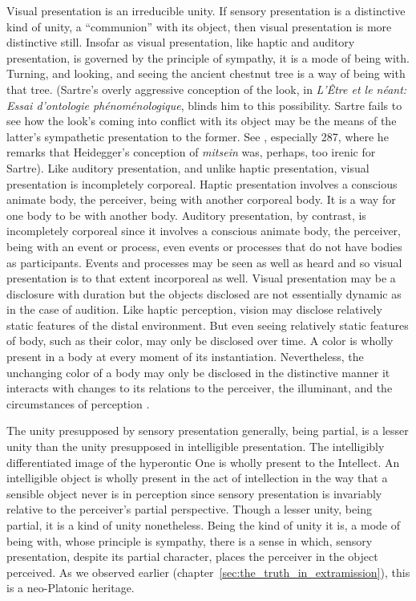 Visual presentation is an irreducible unity. If sensory presentation is a distinctive kind of unity, a ``communion'' with its object, then visual presentation is more distinctive still. Insofar as visual presentation, like haptic and auditory presentation, is governed by the principle of sympathy, it is a mode of being with. Turning, and looking, and seeing the ancient chestnut tree is a way of being with that tree. (Sartre's overly aggressive conception of the look, in \emph{L'Être et le néant: Essai d'ontologie phénoménologique}, blinds him to this possibility. Sartre fails to see how the look's coming into conflict with its object may be the means of the latter's sympathetic presentation to the former. See \citealt[chapter 5]{Jay:1994aa}, especially 287, where he remarks that Heidegger's conception of \emph{mitsein} was, perhaps, too irenic for Sartre). Like auditory presentation, and unlike haptic presentation, visual presentation is incompletely corporeal. Haptic presentation involves a conscious animate body, the perceiver, being with another corporeal body. It is a way for one body to be with another body. Auditory presentation, by contrast, is incompletely corporeal since it involves a conscious animate body, the perceiver, being with an event or process, even events or processes that do not have bodies as participants. Events and processes may be seen as well as heard and so visual presentation is to that extent incorporeal as well. Visual presentation may be a disclosure with duration but the objects disclosed are not essentially dynamic as in the case of audition. Like haptic perception, vision may disclose relatively static features of the distal environment. But even seeing relatively static features of body, such as their color, may only be disclosed over time. A color is wholly present in a body at every moment of its instantiation. Nevertheless, the unchanging color of a body may only be disclosed in the distinctive manner it interacts with changes to its relations to the perceiver, the illuminant, and the circumstances of perception \citep{Broackes:1997pa,Noe:2004fk,Matthen:2005md}.

The unity presupposed by sensory presentation generally, being partial, is a lesser unity than the unity presupposed in intelligible presentation. The intelligibly differentiated image of the hyperontic One is wholly present to the Intellect. An intelligible object is wholly present in the act of intellection in the way that a sensible object never is in perception since sensory presentation is invariably relative to the perceiver's partial perspective. Though a lesser unity, being partial, it is a kind of unity nonetheless. Being the kind of unity it is, a mode of being with, whose principle is sympathy, there is a sense in which, sensory presentation, despite its partial character, places the perceiver in the object perceived. As we observed earlier (chapter~\ref{sec:the_truth_in_extramission}), this is a neo-Platonic heritage. 

